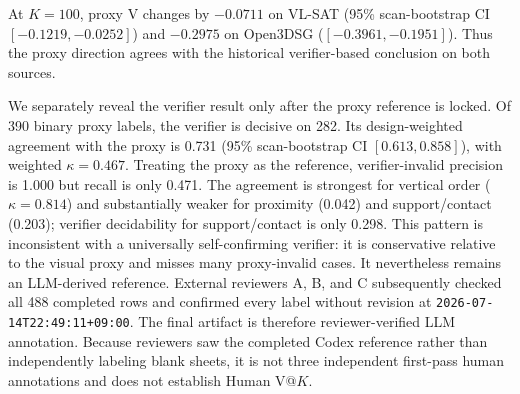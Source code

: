 At $K=100$, proxy V changes by $-0.0711$ on VL-SAT (95\% scan-bootstrap CI
$[-0.1219,-0.0252]$) and $-0.2975$ on Open3DSG
($[-0.3961,-0.1951]$). Thus the proxy direction agrees with the historical
verifier-based conclusion on both sources.

We separately reveal the verifier result only after the proxy reference is
locked. Of 390 binary proxy labels, the verifier is decisive on 282. Its
design-weighted agreement with the proxy is 0.731 (95\% scan-bootstrap CI
$[0.613,0.858]$), with weighted $\kappa=0.467$. Treating the proxy as the
reference, verifier-invalid precision is 1.000 but recall is only 0.471. The
agreement is strongest for vertical order ($\kappa=0.814$) and substantially
weaker for proximity (0.042) and support/contact (0.203); verifier decidability
for support/contact is only 0.298. This pattern is inconsistent with a
universally self-confirming verifier: it is conservative relative to the
visual proxy and misses many proxy-invalid cases. It nevertheless remains an
LLM-derived reference. External reviewers A, B, and C subsequently checked all
488 completed rows and confirmed every label without revision at
\texttt{2026-07-14T22:49:11+09:00}. The final artifact is therefore
reviewer-verified LLM annotation. Because reviewers saw the completed Codex
reference rather than independently labeling blank sheets, it is not three
independent first-pass human annotations and does not establish Human V@$K$.

